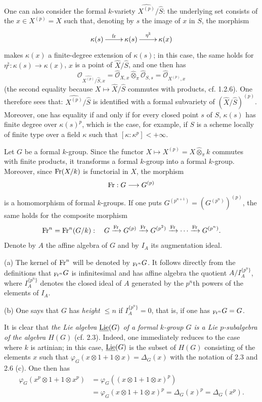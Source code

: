 One can also consider the formal $k$-variety $\widehat{X^{(p)}}/\widehat S$: the underlying set consists of the $x\in X^{(p)}=X$ such that, denoting by $s$ the image of $x$ in $S$, the morphism
\[
\xymatrix{\kappa(s)\ar[r]^{\operatorname{fr}}&\kappa(s)\ar[r]^{\eta^\natural}&\kappa(x)}
\]
makes $\kappa(x)$ a finite-degree extension of $\kappa(s)$; in this case, the same holds for $\eta^\natural:\kappa(s)\to\kappa(x)$, \ie $x$ is a point of $\widehat X/\widehat S$, and one then has
\[
\mathcal O_{\widehat{X^{(p)}}/\widehat S,x}=\widehat{\mathcal O}_{X,x}\widehat\otimes_\pi\widehat{\mathcal O}_{S,s}=\widehat{\mathcal O}_{X^{(p)},x}
\]
(the second equality because $X\mapsto\widehat X/\widehat S$ commutes with products, cf. 1.2.6). One therefore sees that: $\widehat{X^{(p)}}/\widehat S$ is identified with a formal subvariety of $(\widehat X/\widehat S)^{(p)}$. Moreover, one has equality if and only if for every closed point $s$ of $S$, $\kappa(s)$ has finite degree over $\kappa(s)^p$, which is the case, for example, if $S$ is a scheme locally of finite type over a field $\kappa$ such that $[\kappa:\kappa^p]<+\infty$.

Let $G$ be a formal $k$-group. Since the functor $X\mapsto X^{(p)}=X\widehat\otimes_\pi k$ commutes with finite products, it transforms a formal $k$-group into a formal $k$-group. Moreover, since $\operatorname{Fr}(X/k)$ is functorial in $X$, the morphism
\[
\operatorname{Fr}:G\longrightarrow G^{(p)}
\]
is a homomorphism of formal $k$-groups. If one puts $G^{(p^{n+1})}=(G^{(p^n)})^{(p)}$, the same holds for the composite morphism
\[
\operatorname{Fr}^n=\operatorname{Fr}^n(G/k):\quad G\xrightarrow{\operatorname{Fr}}G^{(p)}\xrightarrow{\operatorname{Fr}}G^{(p^2)}\xrightarrow{\operatorname{Fr}}\cdots\xrightarrow{\operatorname{Fr}}G^{(p^n)}.
\]
Denote by $A$ the affine algebra of $G$ and by $I_A$ its augmentation ideal.
\begin{definitions}{}
(a) The kernel of $\operatorname{Fr}^n$ will be denoted by ${}_{\operatorname{Fr}^n}G$. It follows directly from the definitions that ${}_{\operatorname{Fr}^n}G$ is infinitesimal and has affine algebra the quotient $A/I_A^{\{p^n\}}$, where $I_A^{\{p^n\}}$ denotes the closed ideal of $A$ generated by the $p^n$th powers of the elements of $I_A$.

(b) One says that $G$ has \emph{height $\le n$} if $I_A^{\{p^n\}}=0$, that is, if one has ${}_{\operatorname{Fr}^n}G=G$.
\end{definitions}

It is clear that \emph{the Lie algebra $\underline{\operatorname{Lie}}(G)$ of a formal $k$-group $G$ is a Lie $p$-subalgebra of the algebra $H(G)$} (cf. 2.3). Indeed, one immediately reduces to the case where $k$ is artinian; in this case, $\underline{\operatorname{Lie}}(G)$ is the subset of $H(G)$ consisting of the elements $x$ such that $\varphi_G(x\otimes1+1\otimes x)=\Delta_G(x)$ with the notation of 2.3 and 2.6 (c). One then has
\[
\begin{aligned}
\varphi_G(x^p\otimes1+1\otimes x^p)&=\varphi_G((x\otimes1+1\otimes x)^p)\\
&=\varphi_G(x\otimes1+1\otimes x)^p=\Delta_G(x)^p=\Delta_G(x^p).
\end{aligned}
\]


